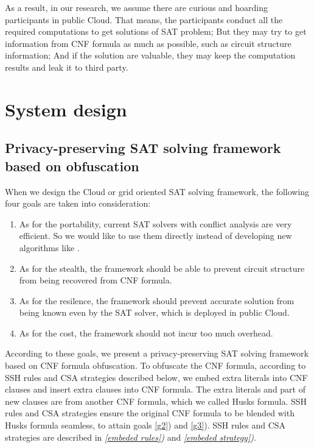 \documentclass[conference]{IEEEtran}
\begin{document}
As a result,
in our research,
we assume there are
curious and hoarding participants\cite{HV-grid} in public Cloud.
That means,
the participants conduct all the required computations to get solutions of SAT problem;
But they may try to get information from CNF formula as much as possible, 
such as circuit structure information;
And if the solution are valuable, they may keep the computation results and leak it to third party.

\section{System design}

\subsection{Privacy-preserving SAT solving framework based on obfuscation}
When we design the Cloud or grid oriented SAT solving framework, the following four goals are taken into consideration:
\begin{enumerate}
 \item 
As for the portability, current SAT solvers with conflict analysis \cite{Minisat} are very efficient.
So we would like to use them directly 
instead of developing new algorithms like \cite{OBfuscationd-CNFs}.
 \item \label{g2}
As for the stealth\cite{obfuscationBible}, the framework should be able to prevent circuit structure from being recovered from CNF formula.
\item \label{g3}
As for the resilence\cite{obfuscationBible}, the framework should prevent accurate solution from being known even by the SAT solver, which is deployed in public Cloud.
 \item
As for the cost, the framework should not incur too much overhead.
\end{enumerate}

According to these goals,
we present a privacy-preserving SAT solving framework based on CNF formula obfuscation.
To obfuscate the CNF formula,
according to SSH rules and CSA strategies described below,
we embed extra literals into CNF clauses and insert extra clauses into CNF formula.
The extra literals and part of new clauses are from another CNF formula, which we called Husks formula.
SSH rules and CSA strategies ensure the original CNF formula to be blended with Husks formula seamless,
to attain goals  \ref{g2}) and \ref{g3}).
SSH rules and CSA strategies are described in \textit{\ref{embeded rules})} and \textit{\ref{embeded strategy})}.
\end{document}

